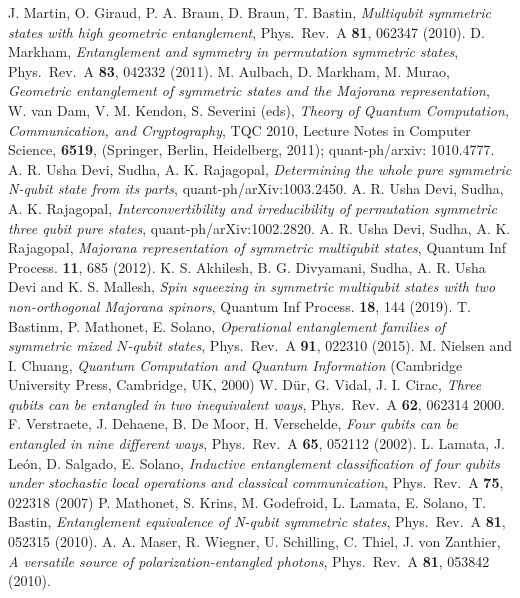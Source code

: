 \begin{thebibliography}{99}
 J. Martin, O. Giraud, P. A. Braun, D. Braun, T. Bastin, {\em Multiqubit symmetric states with high geometric entanglement}, Phys.\ Rev.\ A {\bf 81}, 062347 (2010).
 D. Markham, {\em Entanglement and symmetry in permutation symmetric states}, Phys.\ Rev.\ A  {\bf 83}, 042332 (2011).
 M. Aulbach,  D. Markham, M. Murao, {\em Geometric entanglement of symmetric states and the Majorana representation}, W. van Dam, V. M. Kendon, S. Severini (eds), {\em Theory of Quantum Computation, Communication, and Cryptography}, TQC 2010, Lecture Notes in Computer Science, {\bf 6519}, (Springer, Berlin, Heidelberg, 2011); quant-ph/arxiv: 1010.4777.
 A. R. Usha Devi,  Sudha, A. K. Rajagopal, {\em Determining the whole pure symmetric N-qubit state from its parts},  quant-ph/arXiv:1003.2450.
 A. R. Usha Devi,  Sudha, A. K. Rajagopal, {\em Interconvertibility and irreducibility of permutation symmetric three qubit pure states},
quant-ph/arXiv:1002.2820. 
 A. R. Usha Devi,  Sudha, A. K. Rajagopal, {\em  Majorana representation of symmetric multiqubit states}, Quantum Inf Process. {\bf 11}, 685 (2012).
 K. S. Akhilesh, B. G. Divyamani, Sudha, A. R. Usha Devi and K. S. Mallesh, {\em Spin squeezing in symmetric multiqubit states with two non-orthogonal Majorana spinors}, Quantum Inf Process. {\bf 18}, 144 (2019).  
 T. Bastinm, P. Mathonet, E. Solano, {\em Operational entanglement families of symmetric mixed $N$-qubit states}, Phys.\ Rev.\ A {\bf 91}, 022310 (2015).
 M. Nielsen and I. Chuang, {\em Quantum Computation and Quantum Information} (Cambridge University Press, Cambridge, UK, 2000)
 W. D{\"u}r,  G. Vidal, J. I. Cirac, {\em Three qubits can be entangled in two inequivalent ways}, Phys.\ Rev.\ A {\bf 62}, 062314 2000.
 F. Verstraete, J.  Dehaene, B. De Moor, H. Verschelde, {\em Four qubits can be entangled in nine different ways}, Phys.\ Rev.\ A  {\bf 65}, 052112  (2002).
 L. Lamata, J. Le{\'o}n, D. Salgado, E. Solano, {\em Inductive entanglement classification of four qubits under stochastic local operations and classical communication}, Phys.\ Rev.\ A {\bf 75}, 022318 (2007)
 P. Mathonet, S. Krins, M. Godefroid, L. Lamata, E. Solano, T. Bastin, {\em Entanglement equivalence of N-qubit symmetric states},  Phys.\  Rev.\ A {\bf 81}, 052315  (2010).
  A. A. Maser, R. Wiegner, U. Schilling, C. Thiel, J. von Zanthier, {\em A versatile source of polarization-entangled photons},  Phys.\ Rev.\ A {\bf 81}, 053842 (2010).

\end{thebibliography}
